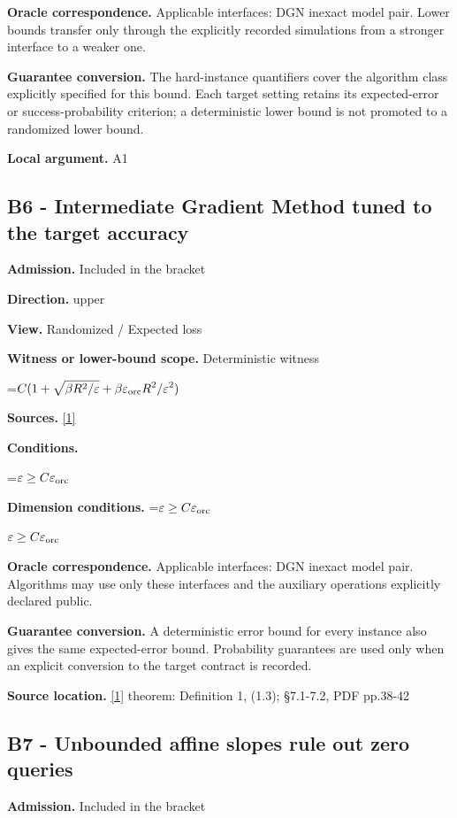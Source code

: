 \documentclass[10pt,a4paper]{article}
\newcommand{\AtlasMath}[1]{\par\begingroup\centering\setbox0=\hbox{$\displaystyle #1$}\ifdim\wd0>1.4\linewidth\typeout{ATLAS WIDE FORMULA: \the\wd0}\fi\ifdim\wd0>\linewidth\resizebox{\linewidth}{!}{\box0}\else\box0\fi\par\endgroup}
\newcommand{\AtlasInlineMath}[1]{\begingroup\setbox0=\hbox{$#1$}\ifdim\wd0>.4\linewidth\endgroup\AtlasMath{#1}\else\endgroup$#1$\fi}
\begin{document}
\textbf{Oracle correspondence.} Applicable interfaces: DGN inexact model pair. Lower bounds transfer only through the explicitly recorded simulations from a stronger interface to a weaker one.

\textbf{Guarantee conversion.} The hard-instance quantifiers cover the algorithm class explicitly specified for this bound. Each target setting retains its expected-error or success-probability criterion; a deterministic lower bound is not promoted to a randomized lower bound.

\textbf{Local argument.} A1

\subsection{B6 - Intermediate Gradient Method tuned to the target accuracy}
\textbf{Admission.} Included in the bracket

\textbf{Direction.} upper

\textbf{View.} Randomized / Expected loss

\textbf{Witness or lower-bound scope.} Deterministic witness

\AtlasMath{C(1+\sqrt{\beta R^2/\varepsilon}+\beta\varepsilon_{\rm orc}R^2/\varepsilon^2)}
\textbf{Sources.} \href{https://optimization-online.org/wp-content/uploads/2014/03/4279.pdf}{[1]}

\textbf{Conditions.} 
\AtlasMath{\varepsilon\ge C\varepsilon_{\rm orc}}


\textbf{Dimension conditions.} \AtlasInlineMath{\varepsilon\ge C\varepsilon_{\rm orc}}

\textbf{Oracle correspondence.} Applicable interfaces: DGN inexact model pair. Algorithms may use only these interfaces and the auxiliary operations explicitly declared public.

\textbf{Guarantee conversion.} A deterministic error bound for every instance also gives the same expected-error bound. Probability guarantees are used only when an explicit conversion to the target contract is recorded.

\textbf{Source location.} \href{https://optimization-online.org/wp-content/uploads/2014/03/4279.pdf}{[1]} theorem: Definition 1, (1.3); §7.1-7.2, PDF pp.38-42

\subsection{B7 - Unbounded affine slopes rule out zero queries}
\textbf{Admission.} Included in the bracket
\end{document}

